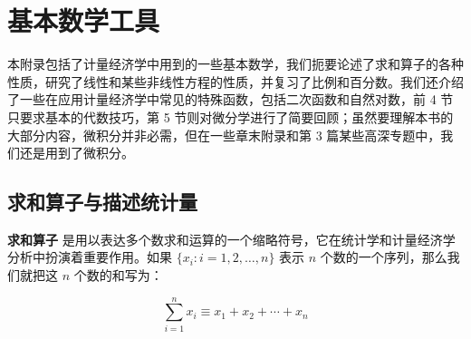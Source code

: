 \documentclass[lang=cn,newtx,10pt,scheme=chinese]{elegantbook}
\begin{document}
\nocite{*}

\printbibliography[heading=bibintoc, title=\ebibname]
\appendix

\chapter{基本数学工具}


本附录包括了计量经济学中用到的一些基本数学，我们扼要论述了求和算子的各种性质，研究了线性和某些非线性方程的性质，并复习了比例和百分数。我们还介绍了一些在应用计量经济学中常见的特殊函数，包括二次函数和自然对数，前 4 节只要求基本的代数技巧，第 5 节则对微分学进行了简要回顾；虽然要理解本书的大部分内容，微积分并非必需，但在一些章末附录和第 3 篇某些高深专题中，我们还是用到了微积分。

\section{求和算子与描述统计量}

\textbf{求和算子} 是用以表达多个数求和运算的一个缩略符号，它在统计学和计量经济学分析中扮演着重要作用。如果 $\{x_i: i=1, 2, \ldots, n\}$ 表示 $n$ 个数的一个序列，那么我们就把这 $n$ 个数的和写为：

\begin{equation}
\sum_{i=1}^n x_i \equiv x_1 + x_2 +\cdots + x_n
\end{equation}
\end{document}
